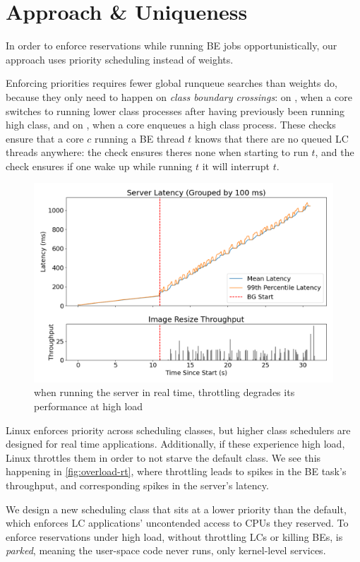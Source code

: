 \section{Approach \& Uniqueness}

In order to enforce reservations while running BE jobs opportunistically, our
approach uses priority scheduling instead of weights.

Enforcing priorities requires fewer global runqueue searches than weights do,
because they only need to happen on \textit{class boundary crossings}: on
\exit{}, when a core switches to running lower class processes after having
previously been running high class, and on \entry{}, when a core enqueues a high
class process. These checks ensure that a core $c$ running a BE thread $t$ knows
that there are no queued LC threads anywhere: the \exit{} check ensures theres
none when starting to run $t$, and the \entry{} check ensures if one wake up
while running $t$ it will interrupt $t$.

\begin{figure}[t]
    \centering
    \includegraphics[width=\columnwidth]{graphs/overload-rt.png}
    \caption{when running the server in real time, throttling degrades
    its performance at high load}\label{fig:overload-rt}
\end{figure}


Linux enforces priority across scheduling classes, but higher class schedulers
are designed for real time applications. Additionally, if these experience high
load, Linux throttles them in order to not starve the default class. We see this
happening in \autoref{fig:overload-rt}, where throttling leads to spikes in the
BE task's throughput, and corresponding spikes in the server's latency.

We design a new scheduling class \beclass{} that sits at a lower priority than
the default, which enforces LC applications' uncontended access to CPUs they
reserved. To enforce reservations under high load, without throttling LCs or
killing BEs, \beclass{} is \textit{parked}, meaning the user-space code never
runs, only kernel-level services.